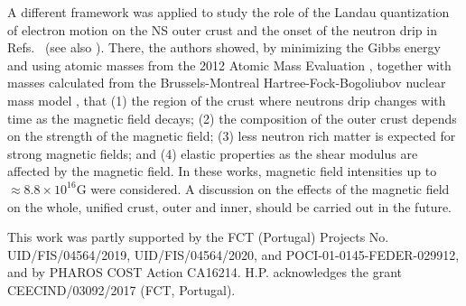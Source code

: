 \documentclass[epj]{svjour}
\begin{document}
A different framework was applied to study the role of the Landau quantization  of electron motion
on the NS outer crust and the onset of the neutron drip in Refs.~\cite{Chamel2012,Chamel2015} (see also \cite{Blaschke2018}). There, the authors showed, by minimizing the Gibbs
energy and using  atomic masses from the 2012 Atomic Mass Evaluation \cite{AME},
together with masses calculated from the Brussels-Montreal
Hartree-Fock-Bogoliubov nuclear mass model \cite{Goriely2013}, that (1) the
region of the crust  where  neutrons drip
changes with time as the magnetic field decays; (2) the composition of the
outer crust depends on the strength of the magnetic field; (3) less
neutron rich matter is expected for strong magnetic fields; and (4) elastic properties
as the shear modulus are affected by the magnetic field. In these
works, magnetic field intensities up to $\approx 8.8\times 10^{16}$G were
considered. A discussion on the effects of the magnetic
  field on the whole, unified crust, outer and inner, should be carried
  out in the future.



\begin{acknowledgement}

This work was partly supported by the FCT (Portugal) Projects No. UID/FIS/04564/2019,  UID/FIS/04564/2020,  and POCI-01-0145-FEDER-029912, and by PHAROS COST Action CA16214. H.P. acknowledges the grant CEECIND/03092/2017 (FCT, Portugal). 

\end{acknowledgement}





\end{document}
